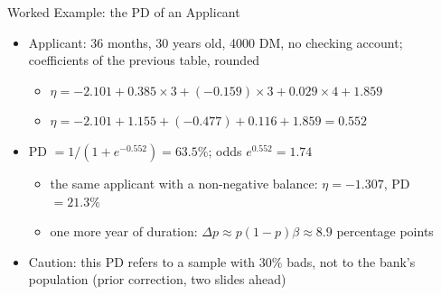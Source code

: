 \begin{frame}{Worked Example: the PD of an Applicant}
\itemsize{\small}
\begin{itemize}
    \item Applicant: 36 months, 30 years old, 4000 DM, no checking account; coefficients of the previous table, rounded
    \begin{itemize}
        \item $\eta = -2.101 + 0.385 \times 3 + (-0.159) \times 3 + 0.029 \times 4 + 1.859$
        \item $\eta = -2.101 + 1.155 + (-0.477) + 0.116 + 1.859 = 0.552$
    \end{itemize}
    \item PD $= 1/(1 + e^{-0.552}) = 63.5\%$; odds $e^{0.552} = 1.74$
    \begin{itemize}
        \item the same applicant with a non-negative balance: $\eta = -1.307$, PD $= 21.3\%$
        \item one more year of duration: $\Delta p \approx p(1 - p)\beta \approx 8.9$ percentage points
    \end{itemize}
    \item Caution: this PD refers to a sample with 30\% bads, not to the bank's population (prior correction, two slides ahead)
\end{itemize}
\end{frame}

